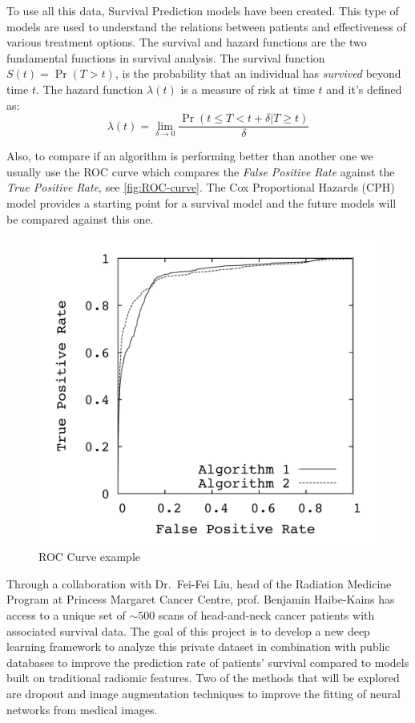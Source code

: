 To use all this data, Survival Prediction models have been created. This type of models are
used to understand the relations between patients and effectiveness of various treatment options. 
The survival and hazard functions are the two fundamental functions in survival analysis. The
survival function \( S(t) = \Pr(T > t) \), is the probability that an individual has
\emph{survived} beyond time \( t \). The hazard function \( \lambda(t) \) is a measure of risk at 
time \( t \) and it's defined as:
~\cite{DeepSurv}
\[
    \lambda(t) = \lim_{\delta \rightarrow 0}
    \frac{\Pr(t \le T < t + \delta | T \ge t)}{\delta}
\]


Also, to compare if an algorithm is performing better than another one we usually use the ROC curve
which compares the \emph{False Positive Rate} against the \emph{True Positive Rate}, see 
\autoref{fig:ROC-curve}. The Cox Proportional Hazards (CPH) model provides a starting point for a 
survival model and the future models will be compared against this one.
~\cites{ROC-precision-recall}{Cox}

\begin{figure}
    \centering
    \includegraphics[width=.5\linewidth]{images/roc_curve}
    \caption{ROC Curve example\label{fig:ROC-curve}}
\end{figure}

Through a collaboration with Dr.~Fei-Fei Liu, head of the Radiation Medicine Program at Princess
Margaret Cancer Centre, prof. Benjamin Haibe-Kains has access to a unique set of \( {\sim}500 \) 
scans of head-and-neck cancer patients with associated survival data. The goal of this project is 
to develop a new deep learning framework to analyze this private dataset in combination with public 
databases to improve the prediction rate of patients' survival compared to models built on 
traditional radiomic features. Two of the methods that will be explored are dropout and image 
augmentation techniques to improve the fitting of neural networks from medical images. 

